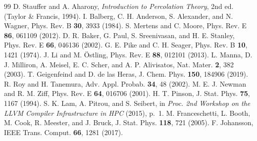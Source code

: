 \documentclass[pre,twocolumn,superscriptaddress,nofootinbib]{revtex4-2}
\begin{document}
\begin{thebibliography}{99}
 D. Stauffer and A. Aharony, \textit{Introduction to Percolation Theory}, 2nd ed. (Taylor \& Francis, 1994).
 I. Balberg, C. H. Anderson, S. Alexander, and N. Wagner, Phys. Rev. B \textbf{30}, 3933 (1984).
 S. Mertens and C. Moore, Phys. Rev. E \textbf{86}, 061109 (2012).
 D. R. Baker, G. Paul, S. Sreenivasan, and H. E. Stanley, Phys. Rev. E \textbf{66}, 046136 (2002).
 G. E. Pike and C. H. Seager, Phys. Rev. B \textbf{10}, 1421 (1974).
 J. Li and M. \"Ostling, Phys. Rev. E \textbf{88}, 012101 (2013).
 L. Manna, D. J. Milliron, A. Meisel, E. C. Scher, and A. P. Alivisatos, Nat. Mater. \textbf{2}, 382 (2003).
 T. Geigenfeind and D. de las Heras, J. Chem. Phys. \textbf{150}, 184906 (2019).
 R. Roy and H. Tanemura, Adv. Appl. Probab. \textbf{34}, 48 (2002).
 M. E. J. Newman and R. M. Ziff, Phys. Rev. E \textbf{64}, 016706 (2001).
 H. T. Pinson, J. Stat. Phys. \textbf{75}, 1167 (1994).
 S. K. Lam, A. Pitrou, and S. Seibert, in \textit{Proc. 2nd Workshop on the LLVM Compiler Infrastructure in HPC} (2015), p.~1.
 M. Franceschetti, L. Booth, M. Cook, R. Meester, and J. Bruck, J. Stat. Phys. \textbf{118}, 721 (2005).
 F. Johansson, IEEE Trans. Comput. \textbf{66}, 1281 (2017).
\end{thebibliography}
\end{document}
